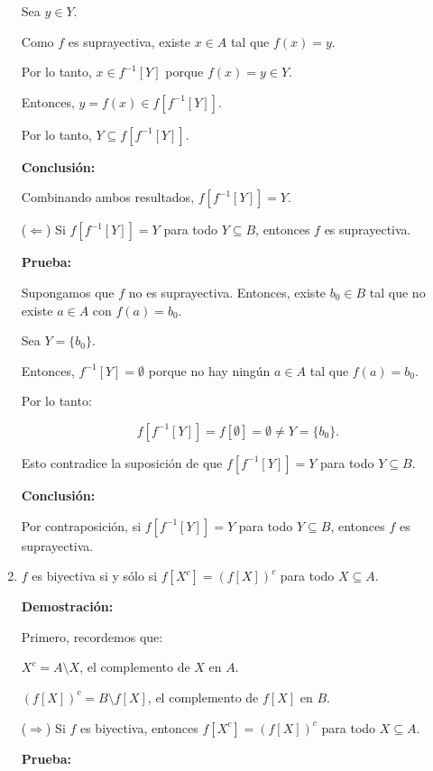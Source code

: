 \begin{solution}
\begin{enumerate}
    Sea \( y \in Y \).
    
    Como \( f \) es suprayectiva, existe \( x \in A \) tal que \( f(x) = y \).
    
    Por lo tanto, \( x \in f^{-1}[Y] \) porque \( f(x) = y \in Y \).
    
    Entonces, \( y = f(x) \in f[f^{-1}[Y]] \).
    
    Por lo tanto, \( Y \subseteq f[f^{-1}[Y]] \).
    
    \textbf{Conclusión:}
    
    Combinando ambos resultados, \( f[f^{-1}[Y]] = Y \).
    
    ($\Leftarrow$) Si \( f[f^{-1}[Y]] = Y \) para todo \( Y \subseteq B \), entonces \( f \) es suprayectiva.
    
    \textbf{Prueba:}
    
    Supongamos que \( f \) no es suprayectiva. Entonces, existe \( b_0 \in B \) tal que no existe \( a \in A \) con \( f(a) = b_0 \).
    
    Sea \( Y = \{ b_0 \} \).
    
    Entonces, \( f^{-1}[Y] = \emptyset \) porque no hay ningún \( a \in A \) tal que \( f(a) = b_0 \).
    
    Por lo tanto:
    
    \[f[f^{-1}[Y]] = f[\emptyset] = \emptyset \neq Y = \{ b_0 \}.\]
    
    Esto contradice la suposición de que \( f[f^{-1}[Y]] = Y \) para todo \( Y \subseteq B \).
    
    \textbf{Conclusión:}
    
    Por contraposición, si \( f[f^{-1}[Y]] = Y \) para todo \( Y \subseteq B \), entonces \( f \) es suprayectiva.
    
    \item \( f \) es biyectiva si y sólo si \( f[X^c] = (f[X])^c \) para todo \( X \subseteq A \).
    
    \textbf{Demostración:}
    
    Primero, recordemos que:
    
    \( X^c = A \setminus X \), el complemento de \( X \) en \( A \).

    \( (f[X])^c = B \setminus f[X] \), el complemento de \( f[X] \) en \( B \).
    
    ($\Rightarrow$) Si \( f \) es biyectiva, entonces \( f[X^c] = (f[X])^c \) para todo \( X \subseteq A \).
    
    \textbf{Prueba:}
    

\end{enumerate}
\end{solution}
